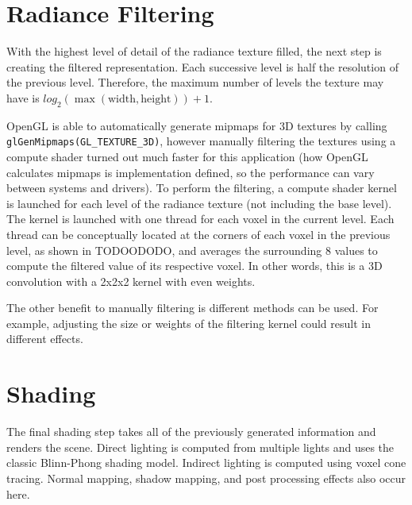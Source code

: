 
\section{Radiance Filtering}
With the highest level of detail of the radiance texture filled, the next step is creating the filtered representation. Each successive level is half the resolution of the previous level. Therefore, the maximum number of levels the texture may have is $log_2 (\max (\text{width}, \text{height})) + 1$.

OpenGL is able to automatically generate mipmaps for 3D textures by calling \verb#glGenMipmaps(GL_TEXTURE_3D)#, however manually filtering the textures using a compute shader turned out much faster for this application (how OpenGL calculates mipmaps is implementation defined, so the performance can vary between systems and drivers). To perform the filtering, a compute shader kernel is launched for each level of the radiance texture (not including the base level). The kernel is launched with one thread for each voxel in the current level. Each thread can be conceptually located at the corners of each voxel in the previous level, as shown in TODOODODO, and averages the surrounding 8 values to compute the filtered value of its respective voxel. In other words, this is a 3D convolution with a 2x2x2 kernel with even weights.

The other benefit to manually filtering is different methods can be used. For example, adjusting the size or weights of the filtering kernel could result in different effects.

\section{Shading}
The final shading step takes all of the previously generated information and renders the scene. Direct lighting is computed from multiple lights and uses the classic Blinn-Phong shading model. Indirect lighting is computed using voxel cone tracing. Normal mapping, shadow mapping, and post processing effects also occur here.


